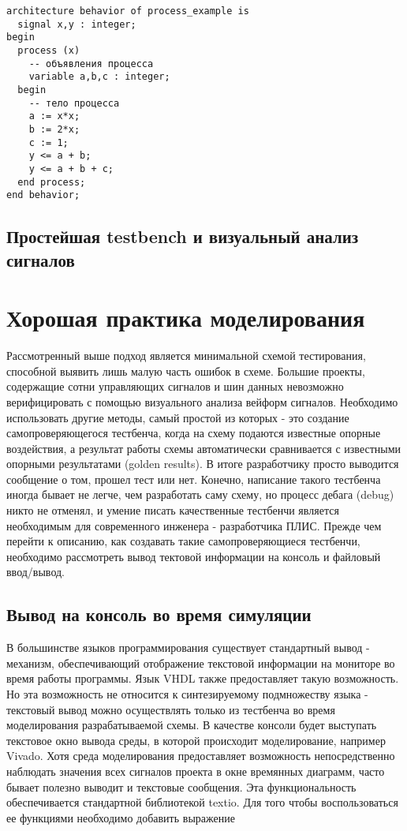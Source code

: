 \begin{Code}
\begin{lstlisting}[caption=Процесс с внутренними переменными и списком чувствительности, label=process_2]
architecture behavior of process_example is
  signal x,y : integer; 
begin
  process (x)
    -- объявления процесса
    variable a,b,c : integer;
  begin
    -- тело процесса
    a := x*x;
    b := 2*x;
    c := 1;
    y <= a + b;  
    y <= a + b + c; 
  end process;
end behavior;
\end{lstlisting}
\end{Code}



\subsection{Простейшая testbench и визуальный анализ сигналов}

\section{Хорошая практика моделирования}

Рассмотренный выше подход является минимальной схемой тестирования, способной выявить лишь малую часть ошибок в схеме. Большие проекты, содержащие сотни управляющих сигналов и шин данных невозможно верифицировать с помощью визуального анализа вейформ сигналов. Необходимо использовать другие методы, самый простой из которых - это создание самопроверяющегося тестбенча, когда на схему подаются известные опорные воздействия, а результат работы схемы автоматически сравнивается с известными опорными результатами (golden results). В итоге разработчику просто выводится сообщение о том, прошел тест или нет. Конечно, написание такого тестбенча иногда бывает не легче, чем разработать саму схему, но процесс дебага (debug) никто не отменял, и умение писать качественные тестбенчи является необходимым для современного инженера - разработчика ПЛИС. Прежде чем перейти к описанию, как создавать такие самопроверяющиеся тестбенчи, необходимо рассмотреть вывод тектовой информации на консоль и файловый ввод/вывод. 

\subsection{Вывод на консоль во время симуляции}

В большинстве языков программирования существует стандартный вывод - механизм, обеспечивающий отображение текстовой информации на мониторе во время работы программы. Язык VHDL также предоставляет такую возможность. Но эта возможность не относится к синтезируемому подмножеству языка - текстовый вывод можно осуществлять только из тестбенча во время моделирования разрабатываемой схемы. В качестве консоли будет выступать текстовое окно вывода среды, в которой происходит моделирование, например Vivado. Хотя среда моделирования предоставляет возможность непосредственно наблюдать значения всех сигналов проекта в окне времянных диаграмм, часто бывает полезно выводит и текстовые сообщения. Эта функциональность обеспечивается стандартной библиотекой textio. Для того чтобы воспользоваться ее функциями необходимо добавить выражение

